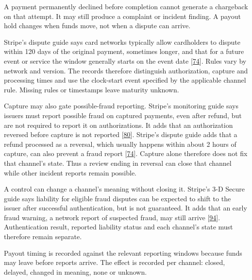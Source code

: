 \documentclass[
  11pt,
]{article}
\begin{document}
A payment permanently declined before completion cannot generate a
chargeback on that attempt. It may still produce a complaint or incident
finding. A payout hold changes when funds move, not when a dispute can
arrive.

Stripe's dispute guide says card networks typically allow cardholders to
dispute within 120 days of the original payment, sometimes longer, and
that for a future event or service the window generally starts on the
event date {[}\protect\hyperlink{ref-Stripe2026Disputes}{74}{]}. Rules
vary by network and version. The records therefore distinguish
authorization, capture and processing times and use the clock-start
event specified by the applicable channel rule. Missing rules or
timestamps leave maturity unknown.

Capture may also gate possible-fraud reporting. Stripe's monitoring
guide says issuers must report possible fraud on captured payments, even
after refund, but are not required to report it on authorizations. It
adds that an authorization reversed before capture is not reported
{[}\protect\hyperlink{ref-Stripe2026MonitoringPrograms}{80}{]}. Stripe's
dispute guide adds that a refund processed as a reversal, which usually
happens within about 2 hours of capture, can also prevent a fraud report
{[}\protect\hyperlink{ref-Stripe2026Disputes}{74}{]}. Capture alone
therefore does not fix that channel's state. Thus a review ending in
reversal can close that channel while other incident reports remain
possible.

A control can change a channel's meaning without closing it. Stripe's
3-D Secure guide says liability for eligible fraud disputes can be
expected to shift to the issuer after successful authentication, but is
not guaranteed. It adds that an early fraud warning, a network report of
suspected fraud, may still arrive
{[}\protect\hyperlink{ref-Stripe2026ThreeDS}{94}{]}. Authentication
result, reported liability status and each channel's state must
therefore remain separate.

Payout timing is recorded against the relevant reporting windows because
funds may leave before reports arrive. The effect is recorded per
channel: closed, delayed, changed in meaning, none or unknown.
\end{document}
